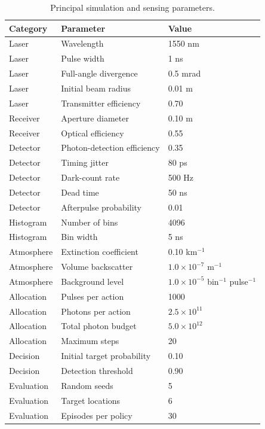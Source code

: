 \begin{table}[ht]
\centering
\caption{Principal simulation and sensing parameters.}
\label{tab:simulation_parameters}
\begin{tabular}{lll}
\toprule
Category & Parameter & Value \\
\midrule
Laser & Wavelength & 1550 nm \\
Laser & Pulse width & 1 ns \\
Laser & Full-angle divergence & 0.5 mrad \\
Laser & Initial beam radius & 0.01 m \\
Laser & Transmitter efficiency & 0.70 \\
Receiver & Aperture diameter & 0.10 m \\
Receiver & Optical efficiency & 0.55 \\
Detector & Photon-detection efficiency & 0.35 \\
Detector & Timing jitter & 80 ps \\
Detector & Dark-count rate & 500 Hz \\
Detector & Dead time & 50 ns \\
Detector & Afterpulse probability & 0.01 \\
Histogram & Number of bins & 4096 \\
Histogram & Bin width & 5 ns \\
Atmosphere & Extinction coefficient & 0.10 km$^{-1}$ \\
Atmosphere & Volume backscatter & $1.0\times10^{-7}$ m$^{-1}$ \\
Atmosphere & Background level & $1.0\times10^{-5}$ bin$^{-1}$ pulse$^{-1}$ \\
Allocation & Pulses per action & 1000 \\
Allocation & Photons per action & $2.5\times10^{11}$ \\
Allocation & Total photon budget & $5.0\times10^{12}$ \\
Allocation & Maximum steps & 20 \\
Decision & Initial target probability & 0.10 \\
Decision & Detection threshold & 0.90 \\
Evaluation & Random seeds & 5 \\
Evaluation & Target locations & 6 \\
Evaluation & Episodes per policy & 30 \\
\bottomrule
\end{tabular}
\end{table}
